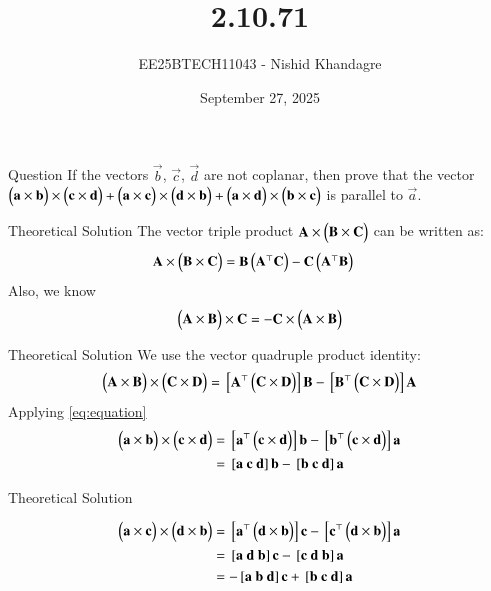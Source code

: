 \documentclass{beamer}
\title
{2.10.71}
\date{September 27, 2025}
\author
{EE25BTECH11043 - Nishid Khandagre}
\begin{document}
\frame{\titlepage}

\begin{frame}{Question}
If the vectors $\vec{b}$, $\vec{c}$, $\vec{d}$ are not coplanar, then prove that the vector
$\begin{pmatrix}\mathbf{a} \times\mathbf{b}\end{pmatrix} \times\begin{pmatrix}\mathbf{c} \times\mathbf{d}\end{pmatrix} + \begin{pmatrix}\mathbf{a} \times\mathbf{c}\end{pmatrix} \times\begin{pmatrix}\mathbf{d} \times\mathbf{b}\end{pmatrix} + \begin{pmatrix}\mathbf{a} \times\mathbf{d}\end{pmatrix} \times\begin{pmatrix}\mathbf{b} \times\mathbf{c}\end{pmatrix}$
is parallel to $\vec{a}$.
\end{frame}

\begin{frame}{Theoretical Solution}
The vector triple product $\mathbf{A} \times \begin{pmatrix}\mathbf{B} \times \mathbf{C}\end{pmatrix}$ can be written as:
\begin{align}
\mathbf{A} \times \begin{pmatrix}\mathbf{B} \times \mathbf{C}\end{pmatrix} &= \mathbf{B}\begin{pmatrix}\mathbf{A}^\top \mathbf{C}\end{pmatrix} - \mathbf{C}\begin{pmatrix}\mathbf{A}^\top \mathbf{B}\end{pmatrix}
\end{align}
Also, we know
\begin{align}
\begin{pmatrix}\mathbf{A} \times \mathbf{B}\end{pmatrix} \times \mathbf{C} = - \mathbf{C} \times \begin{pmatrix}\mathbf{A} \times \mathbf{B}\end{pmatrix}
\end{align}
\end{frame}

\begin{frame}{Theoretical Solution}
We use the vector quadruple product identity:
\begin{align}
\begin{pmatrix}\mathbf{A} \times \mathbf{B}\end{pmatrix} \times \begin{pmatrix}\mathbf{C} \times \mathbf{D}\end{pmatrix} = {}\left[\mathbf{A}^\top \begin{pmatrix}\mathbf{C} \times \mathbf{D}\end{pmatrix}\right] \mathbf{B} - {}\left[\mathbf{B}^\top \begin{pmatrix}\mathbf{C} \times \mathbf{D}\end{pmatrix}\right] \mathbf{A}
\label{eq:equation}
\end{align}
Applying \eqref{eq:equation}
\begin{align}
\myvec{\vec{a} \times\vec{b}}\times \myvec{\vec{c} \times\vec{d}}&= \sbrak{\vec{a}^\top \myvec{\vec{c} \times \vec{d}}} \vec{b} - \sbrak{\vec{b}^\top \myvec{\vec{c} \times \vec{d}}} \vec{a}\\
&=\sbrak{\vec{a} \ \vec{c} \ \vec{d}}\vec{b} - \sbrak{\vec{b} \ \vec{c} \ \vec{d}}\vec{a}
\end{align}
\end{frame}

\begin{frame}{Theoretical Solution}

\begin{align}
\myvec{\vec{a} \times\vec{c}} \times\myvec{\vec{d} \times\vec{b}}&=
\sbrak{\vec{a}^\top \myvec{\vec{d} \times \vec{b}}} \vec{c} - \sbrak{\vec{c}^\top \myvec{\vec{d} \times \vec{b}}} \vec{a}\\
&= \sbrak{\vec{a} \ \vec{d} \ \vec{b}}\vec{c} - \sbrak{\vec{c} \ \vec{d} \ \vec{b}}\vec{a} \\
&= -\sbrak{\vec{a} \ \vec{b} \ \vec{d}}\vec{c} + \sbrak{\vec{b} \ \vec{c} \ \vec{d}}\vec{a}
\end{align}
\end{frame}
\end{document}
